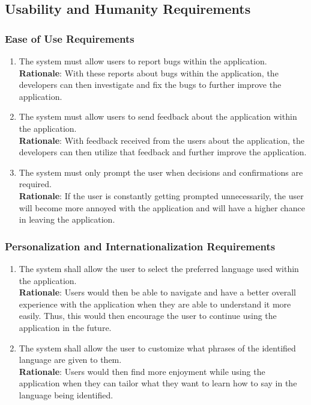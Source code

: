 

\subsection{Usability and Humanity Requirements}
\label{sub:usability_and_humanity_requirements}

\subsubsection{Ease of Use Requirements}
\label{ssub:ease_of_use_requirements}
\begin{enumerate}[{UH-EOU}1. ]
	\item The system must allow users to report bugs within the application.\\ \textbf{Rationale}: With these reports about bugs within the application, the developers can then investigate and fix the bugs to further improve the application.
	\item The system must allow users to send feedback about the application within the application.\\ \textbf{Rationale}: With feedback received from the users about the application, the developers can then utilize that feedback and further improve the application.
	\item The system must only prompt the user when decisions and confirmations are required.\\ \textbf{Rationale}: If the user is constantly getting prompted unnecessarily, the user will become more annoyed with the application and will have a higher chance in leaving the application.
\end{enumerate}


\subsubsection{Personalization and Internationalization Requirements}
\label{ssub:personalization_and_internationalization_requirements}
\begin{enumerate}[{UH-PI}1. ]
	\item The system shall allow the user to select the preferred language used within the application.\\ \textbf{Rationale}: Users would then be able to navigate and have a better overall experience with the application when they are able to understand it more easily. Thus, this would then encourage the user to continue using the application in the future.
	\item The system shall allow the user to customize what phrases of the identified language are given to them.\\ \textbf{Rationale}: Users would then find more enjoyment while using the application when they can tailor what they want to learn how to say in the language being identified.
\end{enumerate}


